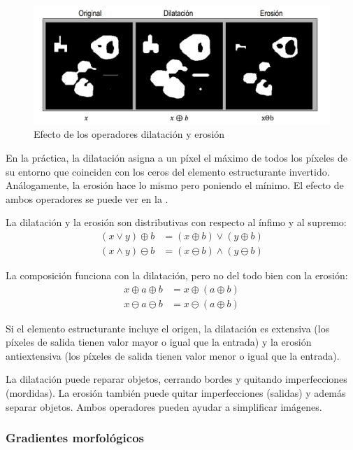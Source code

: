 \documentclass[nochap,palatino,notitlepage]{apuntes}
\begin{document}
\begin{figure}[hbtp]
\centering
\includegraphics[width=1\textwidth]{img/DilatacionErosion.png}
\caption{Efecto de los operadores dilatación y erosión}
\label{fig:DilatacionErosion}
\end{figure}

En la práctica, la dilatación asigna a un píxel el máximo de todos los píxeles de su entorno que coinciden con los ceros del elemento estructurante invertido. Análogamente, la erosión hace lo mismo pero poniendo el mínimo. El efecto de ambos operadores se puede ver en la .

La dilatación y la erosión son distributivas con respecto al ínfimo y al supremo:
\begin{align*}
(x \vee y) \oplus b &= (x\oplus b) \vee (y \oplus b) \\
(x \wedge y) \ominus b &= (x\ominus b) \wedge (y \ominus b)
\end{align*}

La composición funciona con la dilatación, pero no del todo bien con la erosión:
\begin{align*}
x \oplus a \oplus b &= x \oplus (a \oplus b) \\
x \ominus a \ominus b &= x \ominus (a \oplus b)
\end{align*}

Si el elemento estructurante incluye el origen, la dilatación es extensiva (los píxeles de salida tienen valor mayor o igual que la entrada) y la erosión antiextensiva (los píxeles de salida tienen valor menor o igual que la entrada).

La dilatación puede reparar objetos, cerrando bordes y quitando imperfecciones (mordidas). La erosión también puede quitar imperfecciones (salidas) y además separar objetos. Ambos operadores pueden ayudar a simplificar imágenes.

\subsubsection{Gradientes morfológicos}
\end{document}

